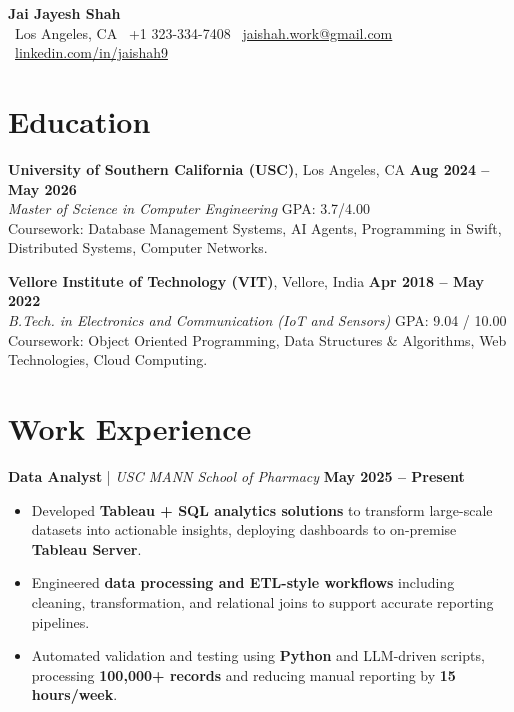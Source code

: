 \documentclass[letterpaper,11pt]{article}
\begin{document}
\begin{center}
    {\LARGE \textbf{Jai Jayesh Shah}}\\
    \small
    \faMapMarker*\ Los Angeles, CA
    \quad
    \faPhone*\ +1 323-334-7408
    \quad
    \faEnvelope\ \href{mailto:jaishah.work@gmail.com} {jaishah.work@gmail.com}
    \quad
    \faLinkedin\ \href{https://www.linkedin.com/in/jaishah9} {linkedin.com/in/jaishah9}
\end{center}
\vspace{-13pt}

\section*{Education}
\textbf{University of Southern California (USC)}, Los Angeles, CA \hfill \textbf{Aug 2024 -- May 2026} \\
\textit{Master of Science in Computer Engineering} \hfill GPA: 3.7/4.00 \\
Coursework: Database Management Systems, AI Agents, Programming in Swift, Distributed Systems, Computer Networks.

\vspace{1pt}

\textbf{Vellore Institute of Technology (VIT)}, Vellore, India \hfill \textbf{Apr 2018 -- May 2022} \\
\textit{B.Tech. in Electronics and Communication (IoT and Sensors)} \hfill GPA: 9.04 / 10.00 \\
Coursework: Object Oriented Programming, Data Structures \& Algorithms, Web Technologies, Cloud Computing.

\section*{Work Experience}
\textbf{Data Analyst} \;|\; \textit{USC MANN School of Pharmacy} \hfill \textbf{May 2025 -- Present} \\
\begin{itemize}[noitemsep]
    \item Developed \textbf{Tableau + SQL analytics solutions} to transform large-scale datasets into actionable insights, deploying dashboards to on-premise \textbf{Tableau Server}.
    \item Engineered \textbf{data processing and ETL-style workflows} including cleaning, transformation, and relational joins to support accurate reporting pipelines.
    \item Automated validation and testing using \textbf{Python} and LLM-driven scripts, processing \textbf{100,000+ records} and reducing manual reporting by \textbf{15 hours/week}.
\end{itemize}
\end{document}
